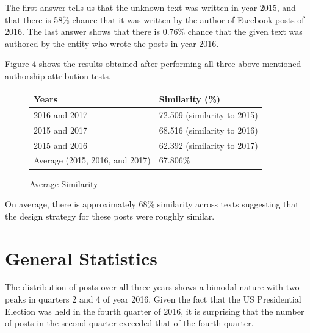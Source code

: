 \documentclass[12pt]{article}
\theoremstyle{definition}
\begin{document}
The first answer tells us that the unknown text was written in year 2015, and
that there is 58\% chance that it was written by the author of Facebook posts
of 2016. The last answer shows that there is 0.76\% chance that the given
text was authored by the entity who wrote the posts in year 2016.

\bigskip

Figure 4 shows the results obtained after performing all three above-mentioned
authorship attribution tests.

\begin{figure}[H]
\centering
\begin{tabular}{|p{8cm}|p{8cm}|}
 \hline
 Years & Similarity (\%)\\
 \hline
 2016 and 2017 & 72.509 (similarity to 2015)\\
 \hline
 2015 and 2017 & 68.516 (similarity to 2016)\\
 \hline
 2015 and 2016 & 62.392 (similarity to 2017)\\
 \hline
 Average (2015, 2016, and 2017) & 67.806\%\\
 \hline
\end{tabular}
\caption{Average Similarity}
\end{figure}

On average, there is approximately 68\% similarity across texts suggesting that
the design strategy for these posts were roughly similar.


\section*{\centering General Statistics}

The distribution of posts over all three years shows a bimodal nature with two
peaks in quarters 2 and 4 of year 2016. Given the fact that the US Presidential
Election was held in the fourth quarter of 2016, it is surprising that the
number of posts in the second quarter exceeded that of the fourth quarter.
\end{document}

